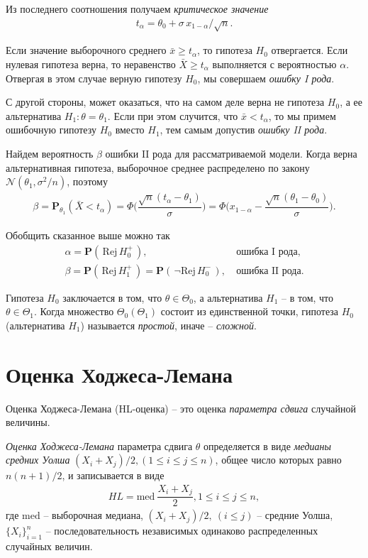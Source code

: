 \documentclass[%
	11pt,
	a4paper,
	utf8,
		]{article}
\begin{document}
Из последнего соотношения получаем \emph{критическое значение}
\begin{align*}
	t_\alpha = \theta_0 + \sigma \, x_{1 - \alpha} / \sqrt{n}.
\end{align*}

Если значение выборочного среднего $ \bar{x} \geqslant t_\alpha$, то гипотеза $ H_0 $ отвергается. Если нулевая гипотеза верна, то неравенство $ \bar{X} \geqslant t_\alpha $ выполняется с вероятностью $ \alpha $. Отвергая в этом случае верную гипотезу $ H_0 $, мы совершаем \emph{ошибку I рода}.

С другой стороны, может оказаться, что на самом деле верна не гипотеза $ H_0 $, а ее альтернатива $ H_1 : \theta = \theta_1$. Если при этом случится, что $ \bar{x} < t_\alpha $, то мы примем ошибочную гипотезу $ H_0 $ вместо $ H_1 $, тем самым допустив \emph{ошибку II рода}.

Найдем вероятность $ \beta $ ошибки II рода для рассматриваемой модели. Когда верна альтернативная гипотеза, выборочное среднее распределено по закону $ \mathcal{N}(\theta_1, \sigma^2/n)$, поэтому
\begin{align*}
	\beta = \mathbf{P}_{\theta_1}(\bar{X} < t_\alpha) = \Phi \Bigg( \dfrac{ \sqrt{n}(t_\alpha - \theta_1) }{\sigma} \Bigg) = \Phi \Bigg( x_{1 - \alpha} - \dfrac{ \sqrt{n}(\theta_1 - \theta_0) }{\sigma} \Bigg).
\end{align*}

Обобщить сказанное выше можно так
\begin{align*}
	\alpha = \mathbf{P}(\,\text{Rej} \, H_0^+\,),\ &\text{ошибка I рода},\\
	\beta = \mathbf{P}(\,\text{Rej} \, H_1^+\,) = \mathbf{P}(\,\neg\text{Rej} \, H_0^-\,),\ &\text{ошибка II рода}.
\end{align*}

Гипотеза $ H_0 $ заключается в том, что $ \theta \in \Theta_0 $, а альтернатива $ H_1 $ -- в том, что $ \theta \in \Theta_1 $. Когда множество $ \Theta_0 (\Theta_1) $ состоит из единственной точки, гипотеза $ H_0 $ (альтернатива $ H_1 $) называется \emph{простой}, иначе -- \emph{сложной}.

\section{Оценка Ходжеса-Лемана}

Оценка Ходжеса-Лемана (HL-оценка) -- это оценка \emph{параметра сдвига} случайной величины.

\emph{\color{blue}Оценка Ходжеса-Лемана} параметра сдвига $ \theta $ определяется в виде \emph{\color{blue}медианы средних Уолша} $ (X_i + X_j) / 2, (1 \leqslant i \leqslant j \leqslant n) $, общее число которых равно $ n (n + 1) / 2 $, и записывается в виде \cite{shulenin:hl}
\begin{align}\label{eq:hl}
	HL = \text{med} \ \dfrac{ X_i + X_j }{2}, 1 \leqslant i \leqslant j \leqslant n,
\end{align}
где $ \text{med} $ -- выборочная медиана, $ (X_i + X_j) / 2, \ (i \leqslant j) $ -- средние Уолша, $ \{ X_i \}_{i = 1}^n $ -- последовательность независимых одинаково распределенных случайных величин.
\end{document}
